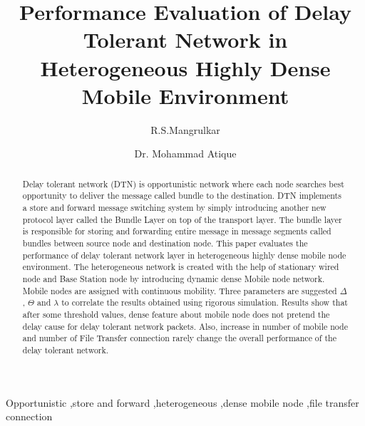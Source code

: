 \documentclass[3p,times]{elsarticle}
\begin{document}
\begin{frontmatter}





\dochead{}


\title{
Performance Evaluation of Delay Tolerant Network in Heterogeneous Highly Dense Mobile Environment 
}
\author[label1]{R.S.Mangrulkar}
\author[label2]{Dr. Mohammad Atique}






\begin{abstract}
Delay tolerant network (DTN) is opportunistic network where each node searches best opportunity to deliver the message called bundle to the destination. DTN implements a store and forward message switching system by simply introducing another new protocol layer called the Bundle Layer on top of the transport layer. The bundle layer is responsible for storing and forwarding entire message in message segments called bundles between source node and destination node. This paper evaluates the performance of delay tolerant network layer in heterogeneous highly dense mobile node environment. The heterogeneous network is created with the help of stationary wired node and Base Station node by introducing dynamic dense Mobile node network. Mobile nodes are assigned with continuous mobility. Three parameters are suggested $\Delta$, $\Theta$ and $\lambda$ to correlate the results obtained using rigorous simulation. Results show that after some threshold values, dense feature about mobile node does not pretend the delay cause for delay tolerant network packets. Also, increase in number of mobile node and number of File Transfer connection rarely change the overall performance of the delay tolerant network.
\end{abstract}

\begin{keyword}
Opportunistic \sep store and forward \sep heterogeneous \sep dense mobile node \sep file transfer connection




\end{keyword}

\end{frontmatter}
\end{document}

